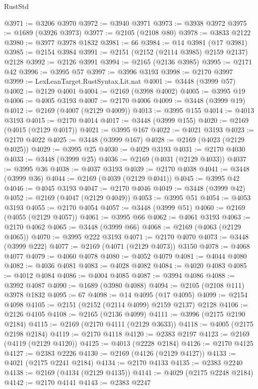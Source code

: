 \begin{lexlean}{RustStd}
\begin{coremodule}
{\begin{coremodule}
{{{{{{{{{{{{{{{{@3971 := @3206 @3970
@3972 := @3940 @3971
@3973 := @3938 @3972
@3975 := @1689 (@3926 @3973)
@3977 := @2105 (@2108 @80)
@3978 := @3833 @2122
@3980 := @3977 @3978 @1832
@3981 := 66
@3984 := @14 @3981 (@17 @3981)
@3985 := @2154 @3984
@3991 := @2151 (@2152 (@2114 @3985) @2159 @2137) @2128
@3992 := @2126 @3991
@3994 := @2165 (@2136 @3985)
@3995 := @2171 @42
@3996 := @3995 @57
@3997 := @3996 @3193
@3998 := @2170 @3997
@3999 := LexLeanTarget.RustSyntax.Lit.nat
@4001 := @3448 (@3999 @57)
@4002 := @2129 @4001
@4004 := @2169 (@3998 @4002)
@4005 := @3995 @19
@4006 := @4005 @3193
@4007 := @2170 @4006
@4009 := @3448 (@3999 @19)
@4012 := @2169 (@4007 (@2129 @4009))
@4013 := @3995 @155
@4014 := @4013 @3193
@4015 := @2170 @4014
@4017 := @3448 (@3999 @155)
@4020 := @2169 (@4015 (@2129 @4017))
@4021 := @3995 @167
@4022 := @4021 @3193
@4023 := @2170 @4022
@4025 := @3448 (@3999 @167)
@4028 := @2169 (@4023 (@2129 @4025))
@4029 := @3995 @25
@4030 := @4029 @3193
@4031 := @2170 @4030
@4033 := @3448 (@3999 @25)
@4036 := @2169 (@4031 (@2129 @4033))
@4037 := @3995 @36
@4038 := @4037 @3193
@4039 := @2170 @4038
@4041 := @3448 (@3999 @36)
@4044 := @2169 (@4039 (@2129 @4041))
@4045 := @3995 @42
@4046 := @4045 @3193
@4047 := @2170 @4046
@4049 := @3448 (@3999 @42)
@4052 := @2169 (@4047 (@2129 @4049))
@4053 := @3995 @51
@4054 := @4053 @3193
@4055 := @2170 @4054
@4057 := @3448 (@3999 @51)
@4060 := @2169 (@4055 (@2129 @4057))
@4061 := @3995 @66
@4062 := @4061 @3193
@4063 := @2170 @4062
@4065 := @3448 (@3999 @66)
@4068 := @2169 (@4063 (@2129 @4065))
@4070 := @3995 @222 @3193
@4071 := @2170 @4070
@4073 := @3448 (@3999 @222)
@4077 := @2169 (@4071 (@2129 @4073)) @3150
@4078 := @4068 @4077
@4079 := @4060 @4078
@4080 := @4052 @4079
@4081 := @4044 @4080
@4082 := @4036 @4081
@4083 := @4028 @4082
@4084 := @4020 @4083
@4085 := @4012 @4084
@4086 := @4004 @4085
@4087 := @3994 @4086
@4088 := @3992 @4087
@4090 := @1689 (@3980 @4088)
@4094 := @2105 (@2108 @111) @3978 @1832
@4095 := 67
@4098 := @14 @4095 (@17 @4095)
@4099 := @2154 @4098
@4105 := @2151 (@2152 (@2114 @4099) @2159 @2137) @2128
@4106 := @2126 @4105
@4108 := @2165 (@2136 @4099)
@4111 := @3996 (@2175 @2190 @2184)
@4115 := @2169 (@2170 @4111 (@2129 @3633))
@4118 := @4005 (@2175 @2198 @2184)
@4119 := @2170 @4118
@4120 := @2383 @2197
@4123 := @2169 (@4119 (@2129 @4120))
@4125 := @4013 (@2228 @2184)
@4126 := @2170 @4125
@4127 := @2383 @2226
@4130 := @2169 (@4126 (@2129 @4127))
@4133 := @4021 (@2175 @2241 @2184)
@4134 := @2170 @4133
@4135 := @2383 @2240
@4138 := @2169 (@4134 (@2129 @4135))
@4141 := @4029 (@2175 @2248 @2184)
@4142 := @2170 @4141
@4143 := @2383 @2247
}}}}}}}}}}}}}}}}
\end{coremodule}}
\end{coremodule}
\end{lexlean}
